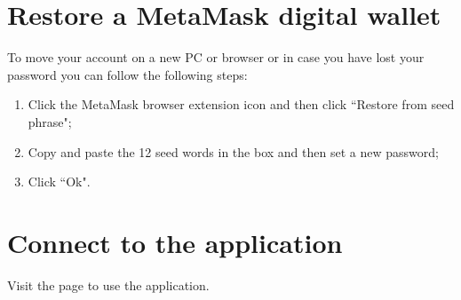 \documentclass[ManualeUtente.tex]{subfiles}
\begin{document}
\section{Restore a MetaMask digital wallet}
To move your account on a new PC or browser or in case you have lost your password you can follow the following steps:
\begin{enumerate}
	\item Click the MetaMask browser extension icon and then click \textquotedblleft Restore from seed phrase";
	\item Copy and paste the 12 seed words in the box and then set a new password;
	\item Click \textquotedblleft Ok".
\end{enumerate}

\section{Connect to the application}
Visit the page  to use the application. %
\end{document}
